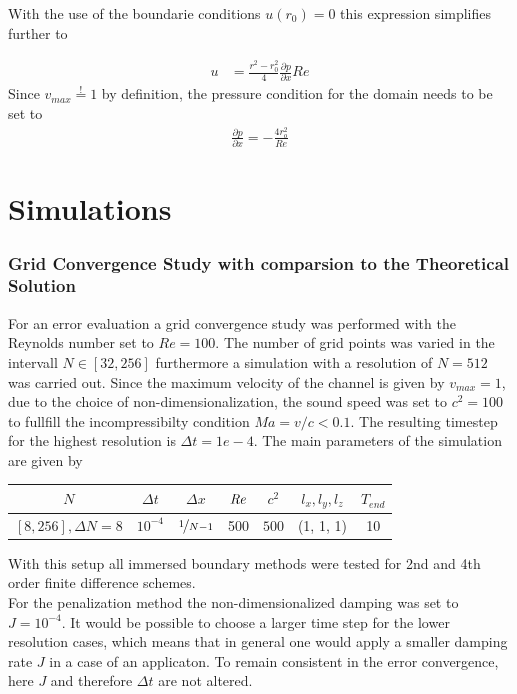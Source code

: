 \clearpage
With the use of the boundarie conditions $u(r_0) = 0$ this expression simplifies further to

\begin{align}
    u &= \frac{r^2 - r_0^2}{4}\frac{\partial p}{\partial x}Re
\end{align}
Since $v_{max} \stackrel{!}{=} 1$ by definition, the pressure condition for the domain needs to be set to
\begin{align}
    \frac{\partial p}{\partial x} = -\frac{4 r_o^2}{Re}
\end{align}

\section{Simulations}

\subsubsection{Grid Convergence Study with comparsion to the Theoretical Solution}

For an error evaluation a grid convergence study was performed with the Reynolds number set to $Re=100$.
The number of grid points was varied in the intervall $N\in[32, 256]$ furthermore a
simulation with a resolution of $N=512$ was carried out.
Since the maximum velocity of the channel is given by $v_{max}=1$, due to the choice of non-dimensionalization,
the sound speed was set to $c^2 = 100$ to fullfill the incompressibilty condition $Ma = v/c < 0.1$.
The resulting timestep for the highest resolution is $\Delta t = 1e-4$.
The main parameters of the simulation are  given by

\begin{center}
\vspace*{0.7ex}
\begin{tabular}{c|c|c|c|c|c|c }
 $ N  $                   & $\Delta t$ & $\Delta x$            & $\mbox{\textit{Re}}$  & $c^2$   & $l_x, l_y, l_z$ & $T_{end}$\\
\hline
 $[8, 256], \Delta N = 8 $& $10^{-4}$ & $\nicefrac{1}{N - 1}$ & 500     & $500$   & (1, 1, 1)       & 10\\
\end{tabular}
\vspace*{0.7ex}
\end{center}

With this setup all immersed boundary methods were tested for 2nd and 4th order finite difference schemes.\\
For the penalization method the non-dimensionalized damping was set to $J=10^{-4}$.
It would be possible to choose a larger time step for the lower resolution cases, which means that in general
one would apply a smaller damping rate $J$ in a case of an applicaton. To remain consistent in the error convergence, here $J$ and
therefore $\Delta t$ are not altered.



